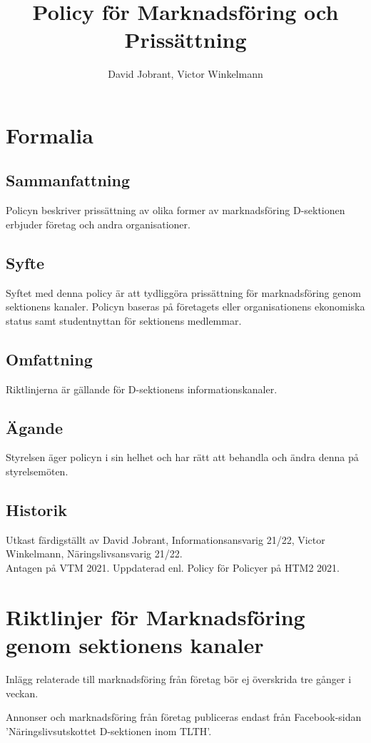 \documentclass{dsekprotokoll}
\title{Policy för Marknadsföring och Prissättning}
\author{David Jobrant, Victor Winkelmann}
\begin{document}
\maketitle
\section{Formalia}
\subsection{Sammanfattning}
Policyn beskriver prissättning av olika former av marknadsföring D-sektionen erbjuder företag och andra organisationer.

\subsection{Syfte}
Syftet med denna policy är att tydliggöra prissättning för marknadsföring genom sektionens kanaler. Policyn baseras på företagets eller organisationens ekonomiska status samt studentnyttan för sektionens medlemmar.

\subsection{Omfattning}
Riktlinjerna är gällande för D-sektionens informationskanaler.

\subsection{Ägande}
Styrelsen äger policyn i sin helhet och har rätt att behandla och ändra denna på styrelsemöten.

\subsection{Historik}
Utkast färdigställt av David Jobrant, Informationsansvarig 21/22, Victor Winkelmann, Näringslivsansvarig 21/22. \\
Antagen på VTM 2021.
Uppdaterad enl. Policy för Policyer på HTM2 2021.

\section{Riktlinjer för Marknadsföring genom sektionens kanaler}
Inlägg relaterade till marknadsföring från företag bör ej överskrida tre gånger i veckan.

Annonser och marknadsföring från företag publiceras endast från Facebook-sidan 'Näringslivsutskottet D-sektionen inom TLTH'.
\end{document}
